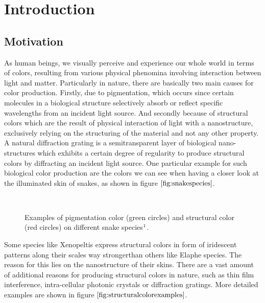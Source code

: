 \chapter{Introduction}
\section{Motivation}
As human beings, we visually perceive and experience our whole world in terms of colors, resulting from various physical phenomina involving interaction between light and matter. Particularly in nature, there are basically two main causes for color production. Firstly, due to pigmentation, which occurs since certain molecules in a biological structure selectively absorb or reflect specific wavelengths from an incident light source. And secondly because of structural colors which are the result of physical interaction of light with a nanostructure, exclusively relying on the structuring of the material and not any other property. A natural diffraction grating is a semitransparent layer of biological nano-structures which exhibits a certain degree of regularity to produce structural colors by diffracting an incident light source. One particular example for such biological color production are the colors we can see when having a closer look at the illuminated skin of snakes, as shown in figure $\ref{fig:snakespecies}$.

\begin{figure}[H]
  \centering
~
  \caption[Example of Biological Color Production]{Examples of pigmentation color (green circles) and structural color (red circles) on different snake species$\footnotemark$.}
  \label{fig:snakespecies}
\end{figure}

Some species like Xenopeltis express structural colors in form of iridescent patterns along their scales way strongerthan others like Elaphe species. The reason for this lies on the nanostructure of their skins. There are a vast amount of additional reasons for producing structural colors in nature, such as thin film interference, intra-cellular photonic crystals or diffraction gratings. More detailed examples are shown in figure $\ref{fig:structuralcolorexamples}$. 

